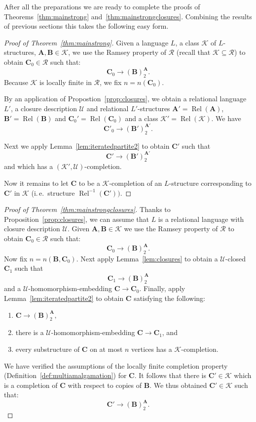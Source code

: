 \documentclass{elsarticle}
\newcommand{\ie}{i.\,e.}
\def\Rel{\mathop{\mathrm{Rel}}\nolimits}
\def\str#1{\mathbf {#1}}
\def\K{{\mathcal K}}
\theoremstyle{plain}
\theoremstyle{definition}
\theoremstyle{remark}
\begin{document}
After all the preparations we are ready to complete the proofs of Theorems~\ref{thm:mainstrong} and~\ref{thm:mainstrongclosures}.
Combining the results of previous sections this takes the following easy form.
\begin{proof}[Proof of Theorem~\ref{thm:mainstrong}]
Given a language $L$, a class $\K$ of $L$-structures, $\str{A},\str{B}\in \K$, we use the Ramsey property of $\mathcal R$ (recall that $\mathcal K\subseteq \mathcal R$)
to obtain $\str{C}_0\in \mathcal R$ such that: $$\str{C}_0\longrightarrow (\str{B})^\str{A}_2.$$
Because $\K$ is locally finite in $\mathcal R$, we fix $n=n(\str{C}_0)$.

By an application of Propostion~\ref{prop:closures}, we obtain a relational language $L'$,
a closure description $\mathcal U$ and relational $L'$-structures $\str{A}'=\Rel(\str{A})$, $\str{B}'=\Rel(\str{B})$ and $\str{C}_0'=\Rel(\str{C}_0)$ and a class $\K'=\Rel(\K)$.
We have
$$\str{C}'_0\longrightarrow (\str{B}')^{\str{A}'}_2.$$

Next we apply Lemma~\ref{lem:iteratedpartite2} to obtain $\str{C}'$ such that
$$\str{C}'\longrightarrow (\str{B}')^{\str{A}'}_2$$
and which has a $(\K',\mathcal U)$-completion.

Now it remains to let $\str{C}$ to be a $\K$-completion of an $L$-structure corresponding to $\str{C}'$ in $\K$ (\ie{}\ structure $\Rel^{-1}(\str C'))$.
\end{proof}


\begin{proof}[Proof of Theorem~\ref{thm:mainstrongclosures}]
Thanks to Proposition~\ref{prop:closures}, we can assume that $L$ is a relational language with closure description $\mathcal U$.
Given $\str{A},\str{B}\in \K$ we use the Ramsey property of $\mathcal R$
to obtain $\str{C}_0\in \mathcal R$ such that:
$$\str{C}_0\longrightarrow (\str{B})^\str{A}_2.$$
Now fix $n=n(\str{B},\str{C}_0)$.
Next apply Lemma~\ref{lem:closures} to obtain a $\mathcal U$-closed $\str{C}_1$ such that
$$\str{C}_1\longrightarrow (\str{B})^\str{A}_2$$
and a $\mathcal U$-homomorphism-embedding $\str C\to\str{C}_0$.
Finally, apply Lemma~\ref{lem:iteratedpartite2} to obtain $\str{C}$ satisfying the following:
\begin{enumerate}[itemsep=0em]
\item $\str{C}\longrightarrow (\str{B})^\str{A}_2,$
\item there is a $\mathcal U$-homomorphism-embedding $\str C\to\str{C}_1$, and
\item every substructure of $\str{C}$ on at most $n$ vertices
has a $\K$-completion.
\end{enumerate}
We have verified the assumptions of the locally finite completion property (Definition~\ref{def:multiamalgamation}) for $\str{C}$. It follows that there is $\str{C}'\in \K$ which is a completion of $\str{C}$ with respect to copies of $\str{B}$. We thus obtained $\str{C}'\in \K$ such that:
$$\str{C}'\longrightarrow (\str{B})^\str{A}_2.$$
\end{proof}
\end{document}
